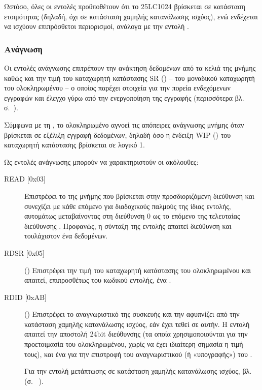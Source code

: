 Ωστόσο, όλες οι εντολές προϋποθέτουν ότι το 25LC1024 βρίσκεται σε κατάσταση
ετοιμότητας (δηλαδή, όχι σε κατάσταση χαμηλής κατανάλωσης ισχύος), ενώ ενδέχεται
να ισχύουν επιπρόσθετοι περιορισμοί, ανάλογα με την εντολή
\parencite[17]{25lc1024}.


\subsubsection{Ανάγνωση}
\label{ssubsec:25lc1024:read-commands}

Οι εντολές ανάγνωσης επιτρέπουν την ανάκτηση δεδομένων από τα κελιά της μνήμης
καθώς και την τιμή του καταχωρητή κατάστασης SR () -- του
μοναδικού καταχωρητή του ολοκληρωμένου -- ο οποίος παρέχει στοιχεία για την
πορεία ενδεχόμενων εγγραφών και έλεγχο γύρω από την ενεργοποίηση της εγγραφής
(περισσότερα βλ. 
σ.~\pageref{ssubsec:25lc1024:write-protect}).

Σύμφωνα με τη \textcite[6]{25lc1024}, το ολοκληρωμένο αγνοεί τις απόπειρες
ανάγνωσης μνήμης όταν βρίσκεται σε εξέλιξη εγγραφή δεδομένων, δηλαδή όσο η
ένδειξη WIP () του καταχωρητή κατάστασης βρίσκεται σε
λογικό 1.

Ως εντολές ανάγνωσης μπορούν να χαρακτηριστούν οι ακόλουθες:
\begin{description}
    \item[READ [0x03{]}] Επιστρέφει το  της μνήμης που βρίσκεται στην
    προσδιοριζόμενη διεύθυνση και συνεχίζει με κάθε επόμενο για διαδοχικούς
    παλμούς της ίδιας εντολής, αυτομάτως μεταβαίνοντας στη διεύθυνση 0 ως το
    επόμενο  της τελευταίας διεύθυνσης \parencite[6--7]{25lc1024}.
    Προφανώς, η σύνταξη της εντολής απαιτεί διεύθυνση και τουλάχιστον ένα
     δεδομένων.

    \item[RDSR [0x05{]}] () Επιστρέφει την τιμή του
    καταχωρητή κατάστασης του ολοκληρωμένου και απαιτεί, επιπροσθέτως του
    κωδικού εντολής, ένα  \parencite[10]{25lc1024}.

    \item[RDID [0xAB{]}] () Επιστρέφει το αναγνωριστικό της συσκευής
    και την αφυπνίζει από την κατάσταση χαμηλής κατανάλωσης ισχύος, εάν έχει
    τεθεί σε αυτήν. Η εντολή απαιτεί την αποστολή 24bit διεύθυνσης (τα οποία
    χρησιμοποιούνται για την προετοιμασία του ολοκληρωμένου, χωρίς να έχει
    ιδιαίτερη σημασία η τιμή τους), και ένα  για την επιστροφή του
    αναγνωριστικού (ή «υπογραφής») του \parencite[17]{25lc1024}
    \label{ssubsec:25lc1024:read-commands:rdid}.

    Για την εντολή μετάπτωσης σε κατάσταση χαμηλής κατανάλωσης ισχύος, βλ.
     (σ.~%
    \pageref{ssubsec:25lc1024:special-commands}).
\end{description}


